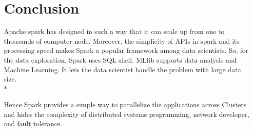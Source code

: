 \section{Conclusion}
\label{sec:conclusion}

Apache spark has designed in such a way that it can scale up from one to thousands of computer node. 
Moreover, the simplicity of APIs in spark and its processing speed makes Spark a popular framework among data scientists. So, for the data exploration, Spark uses SQL shell. MLlib supports data analysis and Machine Learning. It lets the data scientist handle the problem with large data size.\\*

Hence Spark provides a simple way to parallelize the applications across Clusters and hides the complexity of distributed systems programming, network developer, and fault tolerance.